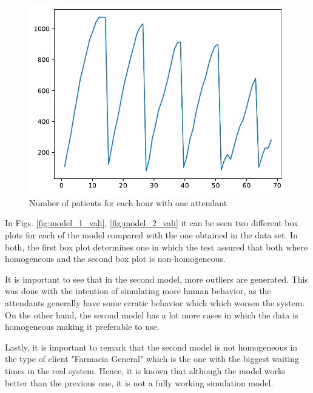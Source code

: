 \begin{figure}[H]
    \centering
    \includegraphics[scale=0.6]{files/validation.pdf}
    \caption{Number of patients for each hour with one attendant}
    \label{fig:one_att_one_week}
\end{figure}

In Figs. \ref{fig:model_1_vali}, \ref{fig:model_2_vali} it can be seen two different box plots for each of the model compared with the one obtained in the data set. In both, the first box plot determines one in which the test assured that both where homogeneous and the second box plot is non-homogeneous.

It is important to see that in the second model, more outliers are generated. This was done with the intention of simulating more human behavior, as the attendants generally have some erratic behavior which which worsen the system. On the other hand, the second model has a lot more cases in which the data is homogeneous making it preferable to use.

Lastly, it is important to remark that the second model is not homogeneous in the type of client "Farmacia General" which is the one with the biggest waiting times in the real system. Hence, it is known that although the model works better than the previous one, it is not a fully working simulation model.

